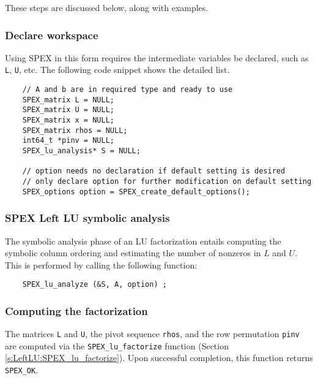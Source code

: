 \documentclass[12pt]{report}
\theoremstyle{definition}
\begin{document}
\noindent These steps are discussed below, along with examples.

\subsubsection{Declare workspace}

Using SPEX in this form requires the intermediate variables be declared, such as \verb|L|, \verb|U|, etc. The following code snippet shows the detailed list.

{\small
\begin{verbatim}
    // A and b are in required type and ready to use
    SPEX_matrix L = NULL;
    SPEX_matrix U = NULL;
    SPEX_matrix x = NULL;
    SPEX_matrix rhos = NULL;
    int64_t *pinv = NULL;
    SPEX_lu_analysis* S = NULL;

    // option needs no declaration if default setting is desired
    // only declare option for further modification on default setting
    SPEX_options option = SPEX_create_default_options();
     \end{verbatim} }

\subsubsection{SPEX Left LU symbolic analysis}

The symbolic analysis phase of an LU factorization entails computing the symbolic column ordering and estimating the number of nonzeros in $L$ and $U$. This is performed by calling the following function:

{\small
    \begin{verbatim}
    SPEX_lu_analyze (&S, A, option) ; \end{verbatim} }


\subsubsection{Computing the factorization}

The matrices \verb|L| and \verb|U|, the pivot sequence \verb|rhos|, and the row
permutation \verb|pinv| are computed via the \verb|SPEX_lu_factorize| function
(Section \ref{s:LeftLU:SPEX_lu_factorize}).  Upon successful completion, this
function returns \verb|SPEX_OK|.
\end{document}
